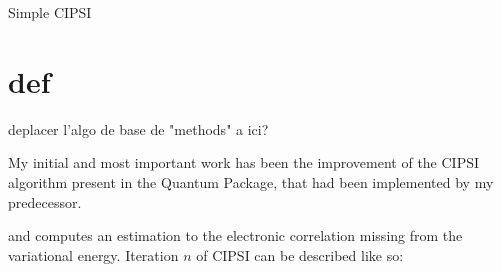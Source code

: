 \documentclass[./thesis.tex]{subfiles}
\begin{document}
\label{chap:CIPSI}


\begin{algorithm}
	\caption{Simple CIPSI}
		\KwData{ $\Psi$ }
\end{algorithm}

\section{def}

\alert{deplacer l'algo de base de "methods" a ici?}

My initial and most important work has been the improvement of the CIPSI algorithm present in the Quantum Package, that had been implemented by my predecessor\cite{giner:tel-01077016}.


and computes an estimation to the electronic correlation missing from the variational energy.
Iteration $n$ of CIPSI can be described like so:
\end{document}

